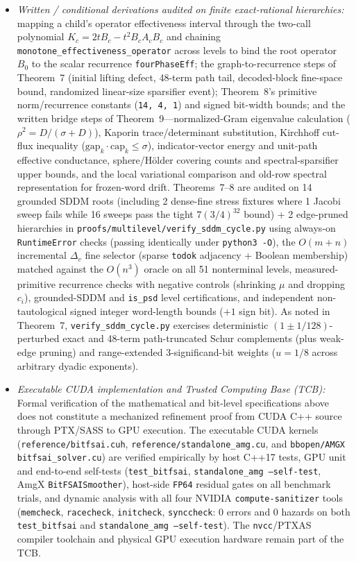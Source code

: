 \documentclass[10pt]{article}
\begin{document}
\begin{itemize}
  \item \emph{Written / conditional derivations audited on finite exact-rational hierarchies:} mapping a child's operator effectiveness interval through the two-call polynomial $K_c = 2 t B_c - t^2 B_c A_c B_c$ and chaining \texttt{monotone\_effectiveness\_operator} across levels to bind the root operator $B_0$ to the scalar recurrence \texttt{fourPhaseEff}; the graph-to-recurrence steps of Theorem~7 (initial lifting defect, 48-term path tail, decoded-block fine-space bound, randomized linear-size sparsifier event); Theorem~8's primitive norm/recurrence constants (\texttt{14, 4, 1}) and signed bit-width bounds; and the written bridge steps of Theorem~9---normalized-Gram eigenvalue calculation ($\rho^2 = D/(\sigma+D)$), Kaporin trace/determinant substitution, Kirchhoff cut-flux inequality ($\mathrm{gap}_k \cdot \mathrm{cap}_k \le \sigma$), indicator-vector energy and unit-path effective conductance, sphere/H\"older covering counts and spectral-sparsifier upper bounds, and the local variational comparison and old-row spectral representation for frozen-word drift. Theorems~7--8 are audited on 14 grounded SDDM roots (including 2 dense-fine stress fixtures where 1 Jacobi sweep fails while 16 sweeps pass the tight $7(3/4)^{32}$ bound) + 2 edge-pruned hierarchies in \texttt{proofs/multilevel/verify\_sddm\_cycle.py} using always-on \texttt{RuntimeError} checks (passing identically under \texttt{python3 -O}), the $O(m+n)$ incremental $\Delta_v$ fine selector (sparse \texttt{todok} adjacency + Boolean membership) matched against the $O(n^3)$ oracle on all 51 nonterminal levels, measured-primitive recurrence checks with negative controls (shrinking $\mu$ and dropping $c_i$), grounded-SDDM and \texttt{is\_psd} level certifications, and independent non-tautological signed integer word-length bounds ($+1$ sign bit). As noted in Theorem~7, \texttt{verify\_sddm\_cycle.py} exercises deterministic $(1 \pm 1/128)$-perturbed exact and 48-term path-truncated Schur complements (plus weak-edge pruning) and range-extended 3-significand-bit weights ($u = 1/8$ across arbitrary dyadic exponents).
  \item \emph{Executable CUDA implementation and Trusted Computing Base (TCB):} Formal verification of the mathematical and bit-level specifications above does not constitute a mechanized refinement proof from CUDA C++ source through PTX/SASS to GPU execution. The executable CUDA kernels (\texttt{reference/bitfsai.cuh}, \texttt{reference/standalone\_amg.cu}, and \texttt{bbopen/AMGX} \texttt{bitfsai\_solver.cu}) are verified empirically by host C++17 tests, GPU unit and end-to-end self-tests (\texttt{test\_bitfsai}, \texttt{standalone\_amg --self-test}, AmgX \texttt{BitFSAISmoother}), host-side \texttt{FP64} residual gates on all benchmark trials, and dynamic analysis with all four NVIDIA \texttt{compute-sanitizer} tools (\texttt{memcheck}, \texttt{racecheck}, \texttt{initcheck}, \texttt{synccheck}: 0 errors and 0 hazards on both \texttt{test\_bitfsai} and \texttt{standalone\_amg --self-test}). The \texttt{nvcc}/PTXAS compiler toolchain and physical GPU execution hardware remain part of the TCB.
\end{itemize}
\end{document}
